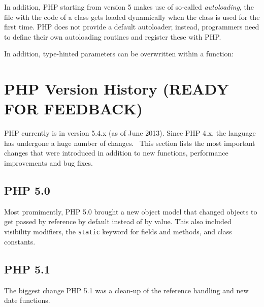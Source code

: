 In addition, PHP starting from version 5 makes use of so-called \emph{autoloading}, \ie the file with the code of a class gets loaded dynamically when the class is used for the first time. PHP does not provide a default autoloader; instead, programmers need to define their own autoloading routines and register these with PHP.~\cite{php-manual-autoloading}


In addition, type-hinted parameters can be overwritten within a function:



\section{PHP Version History (READY FOR FEEDBACK)}

PHP currently is in version 5.4.x (as of June 2013). Since PHP 4.x, the language has undergone a huge number of changes.~\cite{php-history, php-50, php-51, php-52, php-53, php-54} This section lists the most important changes that were introduced in addition to new functions, performance improvements and bug fixes.

\subsection{PHP 5.0}

Most promimently, PHP 5.0 brought a new object model that changed objects to get passed by reference by default instead of by value. This also included visibility modifiers, the \texttt{static} keyword for fields and methods, and class constants.


\subsection{PHP 5.1}

The biggest change PHP 5.1 was a clean-up of the reference handling and new date functions.



